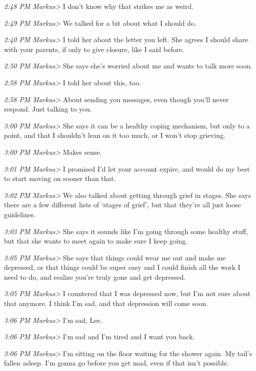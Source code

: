{\emph{2:48 PM Markus\textgreater{}} I don't know why that strikes me as
weird.

\emph{2:49 PM Markus\textgreater{}} We talked for a bit about what I
should do.

\emph{2:40 PM Markus\textgreater{}} I told her about the letter you
left. She agrees I should share with your parents, if only to give
closure, like I said before.

\emph{2:50 PM Markus\textgreater{}} She says she's worried about me and
wants to talk more soon.

\emph{2:58 PM Markus\textgreater{}} I told her about this, too.

\emph{2:58 PM Markus\textgreater{}} About sending you messages, even
though you'll never respond. Just talking to you.

\emph{3:00 PM Markus\textgreater{}} She says it can be a healthy coping
mechanism, but only to a point, and that I shouldn't lean on it too
much, or I won't stop grieving.

\emph{3:00 PM Markus\textgreater{}} Makes sense.

\emph{3:01 PM Markus\textgreater{}} I promised I'd let your account
expire, and would do my best to start moving on sooner than that.

\emph{3:02 PM Markus\textgreater{}} We also talked about getting through
grief in stages. She says there are a few different lists of `stages of
grief', but that they're all just loose guidelines.

\emph{3:03 PM Markus\textgreater{}} She says it sounds like I'm going
through some healthy stuff, but that she wants to meet again to make
sure I keep going.

\emph{3:05 PM Markus\textgreater{}} She says that things could wear me
out and make me depressed, or that things could be super easy and I
could finish all the work I need to do, and realize you're truly gone
and get depressed.

\emph{3:05 PM Markus\textgreater{}} I countered that I was depressed
now, but I'm not sure about that anymore. I think I'm sad, and that
depression will come soon.

\emph{3:06 PM Markus\textgreater{}} I'm sad, Lee.

\emph{3:06 PM Markus\textgreater{}} I'm sad and I'm tired and I want you
back.

\emph{3:06 PM Markus\textgreater{}} I'm sitting on the floor waiting for
the shower again. My tail's fallen asleep. I'm gonna go before you get
mad, even if that isn't possible.

}
